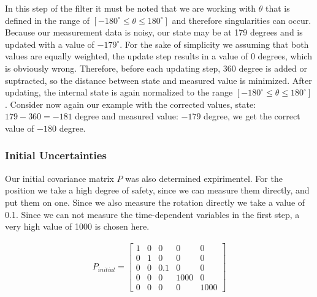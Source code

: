 \documentclass[11pt,oneside,openright]{mpreport}
\begin{document}
In this step of the filter it must be noted that we are working with $\theta$ that is defined in the range of $ [- 180^{\circ} \le \theta \le 180^{\circ}] $ and therefore singularities can occur.
Because our measurement data is noisy, our state may be at 179 degrees and is updated with a value of $ -179^{\circ} $. For the sake of simplicity we assuming that both values are equally weighted,
the update step results in a value of 0 degrees, which is obviously wrong. Therefore, before each updating step, $ 360 $ degree is added or suptracted,
so the distance between state and measured value is minimized. After updating, the internal state is again normalized to the range $ [- 180^{\circ} \le \theta \le 180^{\circ}] $.
Consider now again our example with the corrected values, state: $ 179-360 = -181 $ degree and measured value: $ -179 $ degree, we get the correct value of $ -180 $ degree.


\subsubsection{Initial Uncertainties}

Our initial covariance matrix $ P $ was also determined expirimentel. For the position we take a high degree of safety, since we can measure them directly, and put them on one. 
Since we also measure the rotation directly we take a value of 0.1. Since we can not measure the time-dependent variables in the first step, a very high value of 1000 is chosen here.

\begin{align*}
P_{initial}=
\begin{bmatrix}
1 & 0 & 0 & 0 & 0\\
0 & 1 & 0 & 0 & 0\\
0 & 0 & 0.1 & 0 & 0\\
0 & 0 & 0 & 1000 & 0\\
0 & 0 & 0 & 0 & 1000
\end{bmatrix} 
\end{align*}
\end{document}
